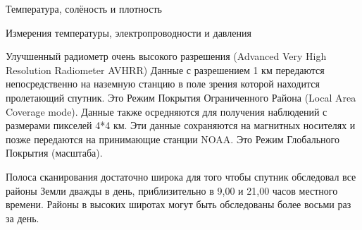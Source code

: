 \begin{chapter}{Температура, солёность и плотность}
\begin{section}{Измерения температуры, электропроводности и давления}
\begin{paragraph}{Улучшенный радиометр очень высокого разрешения (Advanced Very High Resolution Radiometer AVHRR)}
Данные с разрешением 1 км передаются непосредственно на наземную
станцию в поле зрения которой находится пролетающий спутник. Это Режим
Покрытия Ограниченного Района (Local Area Coverage mode). Данные также
осредняются для получения наблюдений с размерами пикселей 4*4 км. Эти
данные сохраняются на магнитных носителях и позже передаются на
принимающие станции NOAA. Это Режим Глобального Покрытия (масштаба).
%

Полоса сканирования достаточно широка для того чтобы спутник
обследовал все районы Земли дважды в день, приблизительно в 9,00 и
21,00 часов местного времени. Районы в высоких широтах могут быть
обследованы более восьми раз за день.
%



\end{paragraph}
\end{section}
\end{chapter}
